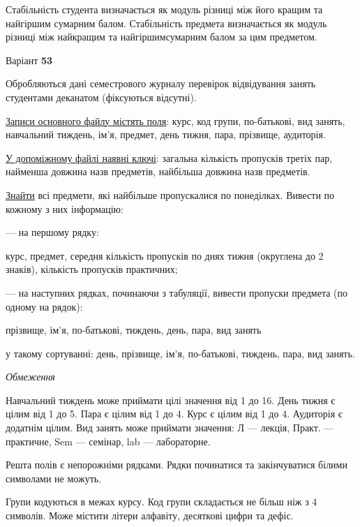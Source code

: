 \documentclass[11pt, ukrainian]{article}
\begin{document}
Стабільність студента визначається як модуль різниці між його кращим та найгіршим сумарним балом.
Стабільність предмета визначається як модуль різниці між найкращим та найгіршимсумарним балом за цим предметом.






\par
\newpage
{\center Варіант  \No \textbf { 53 }\par}
\bigskip
Обробляються дані семестрового журналу перевірок відвідування занять студентами деканатом (фіксуються відсутні). 

\underline{Записи основного файлу містять поля}: курс, код групи, по-батькові, вид занять, навчальний тиждень, ім’я, предмет, день тижня, пара, прізвище, аудиторія.

\underline{У допоміжному файлі наявні ключі}: загальна кількість пропусків третіх пар, найменша довжина назв предметів, найбільша довжина назв предметів.

\underline{Знайти} всі предмети, які найбільше пропускалися по понеділках. Вивести по кожному з них інформацію:\par
{\noindent}--- на першому рядку:\par
курс, предмет, середня кількість пропусків по днях тижня (округлена до 2 знаків), кількість пропусків практичних;

{\noindent}--- на наступних рядках, починаючи з табуляції, вивести пропуски предмета (по одному на рядок):\par
прізвище, ім’я, по-батькові, тиждень, день, пара, вид занять

{\noindent}у такому сортуванні: день, прізвище, ім’я, по-батькові, тиждень, пара, вид занять.


\bigskip\textit{Обмеження}

Навчальний тиждень може приймати цілі значення від 1 до 16.
День тижня є цілим від 1 до 5. Пара є цілим від 1 до 4.
Курс є цілим від 1 до 4. Аудиторія є додатнім цілим.
Вид занять може приймати значення:
Л --- лекція, Практ. --- практичне, Sem --- семінар, lab --- лабораторне.

Решта полів є непорожніми рядками.
Рядки починатися та закінчуватися білими символами не можуть.

Групи кодуються в межах курсу.
Код групи складається не більш ніж з 4 символів.
Може містити літери алфавіту, десяткові цифри та дефіс.
\end{document}
